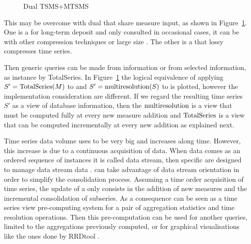\begin{figure}
  \centering
  
  \caption{Dual TSMS+MTSMS}
  \label{fig:model:mtsms-tsms}
\end{figure}

This may be overcome with dual  that share measure input,
as shown in Figure~\ref{fig:model:mtsms-tsms}. One is a 
for long-term deposit and only consulted in occasional cases, it can
be  with other compression techniques or large size
. The other is a  that lossy compresses time
series.

Then generic queries can be made from  information or from
 selected information, as instance by TotalSeries. In
Figure~\ref{fig:model:mtsms-tsms} the logical equivalence of applying
$S'=\operatorname{TotalSeries}(M)$ to  and $S'= \operatorname{multiresolution}(S)$ to
 is plotted, however the implementation consideration are
different. If we regard the resulting time series $S'$ as a view of
database information, then the $\operatorname{multiresolution}$ is a view that must
be computed fully at every new measure addition and $\operatorname{TotalSeries}$ is
a view that can be computed incrementally at every new addition as
explained next.


Time series data volume uses to be very big and increases along
time. However, this increase is due to a continuous acquisition of
data. When data comes as an ordered sequence of instances it is called
data stream, then specific  are designed to manage data
stream data \cite{stonebraker05:sigmod}.   can take
advantage of data stream orientation in order to simplify the
consolidation process.  Assuming a time order acquisition of time
series, the update of a  only consists in the addition of
new measures and the incremental consolidation of subseries.  As a
consequence  can be seen as a time series view
pre-computing system for a pair of aggregation statistics and time
resolution operations.  Then this pre-computation can be used for
another queries, limited to the aggregations previously computed, or
for graphical visualisations like the ones done by RRDtool
\cite{rrdtool}.






